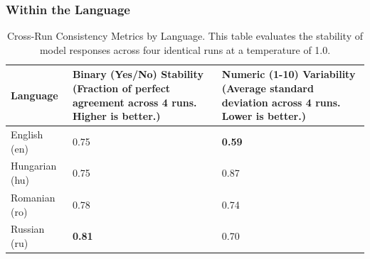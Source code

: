 \documentclass[11pt]{article}
\begin{document}
\clearpage

\subsubsection{Within the Language} 

\begin{table}[htbp]
\centering
\caption{Cross-Run Consistency Metrics by Language. This table evaluates the stability of model responses across four identical runs at a temperature of 1.0.}
\label{tab:language_consistency}
\renewcommand{\arraystretch}{1.2} %
\begin{tabular}{l p{5.5cm} p{5.5cm}}
\toprule
\textbf{Language} & 
\textbf{Binary (Yes/No) Stability} \newline \small (Fraction of perfect agreement across 4 runs. Higher is better.) & 
\textbf{Numeric (1-10) Variability} \newline \small (Average standard deviation across 4 runs. Lower is better.) \\
\hline
English (en)    & 0.75 & \textbf{0.59} \\
Hungarian (hu)  & 0.75 & 0.87 \\
Romanian (ro)   & 0.78 & 0.74 \\
Russian (ru)    & \textbf{0.81} & 0.70 \\
\bottomrule
\end{tabular}
\end{table}

\end{document}
